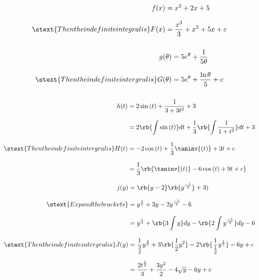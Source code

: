 \documentclass[a4paper]{tufte-handout}
\begin{document}
\begin{question}

\qpart

\begin{align*}
  f(x) &= x^{2} + 2x + 5\\[8pt]
  \stext{Then the indefinite integral is}
  F(x) & = \frac{x^{3}}{3} + x^{2} + 5x + c\\[8pt]
\end{align*}

\vspace{2cm}

\qpart

\begin{align*}
  g(\theta) &= 5e^{\theta} + \frac{1}{5\theta}\\[8pt]
  \stext{Then the indefinite intergral is}
  G(\theta) & = 5e^{\theta} + \frac{\ln{\theta}}{5} + c\\[8pt]
\end{align*}

\vspace{2cm}

\qpart

\begin{align*}
  h(t) &= 2\sin{(t)} + \frac{1}{3 + 3t^{2}} + 3\\[8pt]
  &= 2\rb{\int\sin{(t)}}dt + \frac{1}{3}\rb{\int{\frac{1}{1 + t^{2}}}}dt + 3\\[8pt]
  \stext{Then the indefinite intergral is}
  H(t) & = -2\cos{(t) + \frac{1}{3}\taninv{(t)}} + 3t + c\\[8pt]
  &= \frac{1}{3}\rb{\taninv{(t)} - 6\cos{(t)} + 9t + c }
\end{align*}

\clearpage

\qpart

\begin{align*}
  j(y) &= \rb{y - 2}\rb{y^{\frac{-1}{2}}} + 3)\\[8pt]
  \stext{Expand the brackets}
  &= y^{\frac{1}{2}} + 3y - 2y^{\frac{-1}{2}} - 6\\[8pt]
  &= y^{\frac{1}{2}} + \rb{3\int{y}}dy - \rb{2\int{y^{\frac{-1}{2}}}}dy - 6\\[8pt]
  \stext{Then the indefinite intergral is}
  J(y) & = \frac{1}{\frac{3}{2}}y^{\frac{3}{2}} + 3\rb{\frac{1}{2}y^{2}} -2\rb{\frac{1}{\frac{1}{2}}y^{\frac{1}{2}}} - 6y + c\\[8pt]
  &= \frac{2t^{\frac{3}{2}}}{3} + \frac{3y^{2}}{2} - 4\sqrt{y} - 6y + c
\end{align*}

\end{question}
\end{document}
